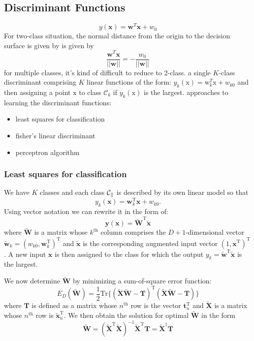 \documentclass[a4paper]{book}
\newcommand{\mrm}{\mathrm}
\newcommand{\mbf}{\mathbf}
\newcommand{\TT}{\mbf T}
\newcommand{\XX}{\mbf X}
\newcommand{\WW}{\mbf W}
\newcommand{\ww}{\mbf w}
\newcommand{\ttt}{\mbf t}
\newcommand{\xx}{\mbf x}
\newcommand{\yy}{\mbf y}
\newcommand{\rev}{^{-1}}
\newcommand{\trans}{^{\mrm T}}
\begin{document}
\subsection{Discriminant Functions}
\begin{equation}\label{}
y(\xx) = \ww^T\xx+w_0
\end{equation}
For two-class situation,  the normal distance from the origin to the decision surface is given by is given by
\begin{equation}\label{}
  \frac{ \ww^T\xx}{||\ww||} = -\frac{w_0}{||\ww||}
\end{equation}
for multiple classes,  it's kind of difficult to reduce to 2-class. a single $K$-class discriminant comprising $K$ linear functions of the form:
$y_k(\mathrm x) = \mathrm w_k^T\mathrm x+w_{k0}$ and then assigning a point $\mathrm x$ to class $\mathcal C_k$ if $y_k(\mathrm x)$ is the largest.\newline
approaches to learning the discriminant functions:
\begin{itemize}
  \item least squares for classification
  \item fisher's linear discriminant
  \item perceptron algorithm
\end{itemize}
\subsubsection*{Least squares for classification}
We have $K$ classes and each class $\cal C_k$ is described by its own linear model so that
\begin{equation}\label{}
  y_k(\xx)=\ww_k\trans\xx+w_{k0}.
\end{equation}
Using vector notation we can rewrite it in the form of:
\begin{equation}\label{}
  \yy(\xx)=\tilde{\WW}\trans\tilde{\xx}
\end{equation}
where $\tilde{\WW}$ is a matrix whose $k^{\mrm{th}}$ column comprises the $D+1$-dimensional vector $\tilde{\ww}_k=(w_{k0}, \ww_k\trans)\trans$ and $\tilde{\xx}$ is the corresponding augmented input vector $(1,\xx\trans)\trans$. A new input $\xx$ is then assigned to the class for which the output $y_k=\tilde{\ww}\trans\tilde{\xx}$ is the largest.

We now determine $\tilde{\WW}$  by minimizing a sum-of-square error function:
\begin{equation}\label{}
  E_D(\tilde{\WW})=\frac12\mrm{Tr}\{(\tilde{\XX}\tilde{\WW}-\TT)\trans(\tilde{\XX}\tilde{\WW}-\TT)\}
\end{equation}
where $\TT$ is defined as a matrix whose $n^{\mrm{th}}$ row is the vector $\ttt_n\trans$ and $\tilde{\XX}$ is a matrix whose $n^{\mrm{th}}$ row is $\tilde{\xx}_n\trans$. We then obtain the solution for optimal $\tilde{\WW}$ in the form
\begin{equation}\label{}
  \tilde{\WW}=(\tilde{\XX}\trans\tilde{\XX})\rev\tilde{\XX}\trans\TT=\tilde{\XX}^\dagger\TT
\end{equation}
\end{document}
